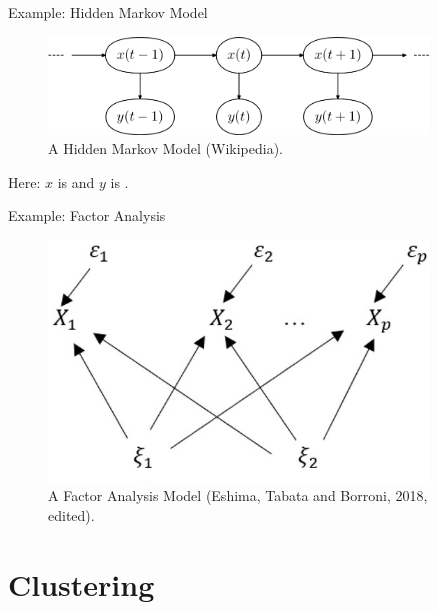 \documentclass[10pt]{beamer}
\begin{document}
\begin{frame}{Example: Hidden Markov Model}

\begin{figure}[h]
\centering
\includegraphics[width=0.9\textwidth]{fig/hmm.png}
\caption{A Hidden Markov Model (Wikipedia). }
\end{figure}

Here: $x$ is  and $y$ is .

\end{frame}


\begin{frame}{Example: Factor Analysis}

\begin{figure}[h]
\centering
\includegraphics[width=0.9\textwidth]{fig/FM.png}
\caption{A Factor Analysis Model (Eshima, Tabata and Borroni, 2018, edited).}
\end{figure}

\end{frame}



\section{Clustering}
\frame{\sectionpage}
\end{document}
